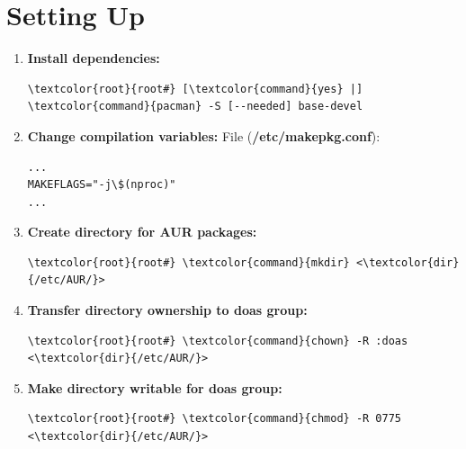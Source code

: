 \documentclass[10pt, a4paper, onecolumn, oneside, titlepage, openany]{book}
\begin{document}
\section{Setting Up}
\begin{enumerate}
    \item \textbf{Install dependencies:}
\begin{Verbatim}[commandchars=\\\{\}]
\textcolor{root}{root#} [\textcolor{command}{yes} |] \textcolor{command}{pacman} -S [--needed] base-devel
\end{Verbatim}
    \item \textbf{Change compilation variables:}
\newline File (\textbf{\textcolor{file}{/etc/makepkg.conf}}):
\begin{Verbatim}[commandchars=\\\{\}]
...
MAKEFLAGS="-j\$(nproc)"
...
\end{Verbatim}
    \item \textbf{Create directory for AUR packages:}
\begin{Verbatim}[commandchars=\\\{\}]
\textcolor{root}{root#} \textcolor{command}{mkdir} <\textcolor{dir}{/etc/AUR/}>
\end{Verbatim}
    \item \textbf{Transfer directory ownership to doas group:}
\begin{Verbatim}[commandchars=\\\{\}]
\textcolor{root}{root#} \textcolor{command}{chown} -R :doas <\textcolor{dir}{/etc/AUR/}>
\end{Verbatim}
    \item \textbf{Make directory writable for doas group:}
\begin{Verbatim}[commandchars=\\\{\}]
\textcolor{root}{root#} \textcolor{command}{chmod} -R 0775 <\textcolor{dir}{/etc/AUR/}>
\end{Verbatim}
\end{enumerate}
\end{document}
